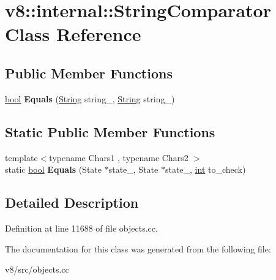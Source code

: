 \hypertarget{classv8_1_1internal_1_1StringComparator}{}\section{v8\+:\+:internal\+:\+:String\+Comparator Class Reference}
\label{classv8_1_1internal_1_1StringComparator}
\subsection*{Public Member Functions}
\begin{DoxyCompactItemize}
\item 
\mbox{\label{classv8_1_1internal_1_1StringComparator_a88e0724b0f4c21f4a09cad45ff79f0ea}} 
\mbox{\hyperlink{classbool}{bool}} {\bfseries Equals} (\mbox{\hyperlink{classv8_1_1internal_1_1String}{String}} string\+\_, \mbox{\hyperlink{classv8_1_1internal_1_1String}{String}} string\+\_)
\end{DoxyCompactItemize}
\subsection*{Static Public Member Functions}
\begin{DoxyCompactItemize}
\item 
\mbox{\label{classv8_1_1internal_1_1StringComparator_a461c33dfaa39d470b8f1efcde929c6c3}} 
{\footnotesize template$<$typename Chars1 , typename Chars2 $>$ }\\static \mbox{\hyperlink{classbool}{bool}} {\bfseries Equals} (State $\ast$state\+\_, State $\ast$state\+\_, \mbox{\hyperlink{classint}{int}} to\+\_\+check)
\end{DoxyCompactItemize}


\subsection{Detailed Description}


Definition at line 11688 of file objects.\+cc.



The documentation for this class was generated from the following file\+:\begin{DoxyCompactItemize}
\item 
v8/src/objects.\+cc\end{DoxyCompactItemize}
